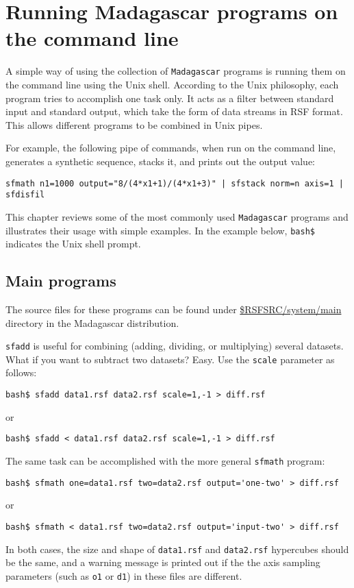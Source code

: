 \chapter{Running Madagascar programs on the command line}

A simple way of using the collection of \texttt{Madagascar} programs
is running them on the command line using the Unix shell. According to
the Unix philosophy, each program tries to accomplish one task
only. It acts as a filter between standard input and standard output,
which take the form of data streams in RSF format. This allows
different programs to be combined in Unix pipes.

For example, the following pipe of commands, when run on the command
line, generates a synthetic sequence, stacks it, and prints out the output value:
\begin{verbatim}
sfmath n1=1000 output="8/(4*x1+1)/(4*x1+3)" | sfstack norm=n axis=1 | sfdisfil
\end{verbatim}

This chapter reviews some of the most commonly used
\texttt{Madagascar} programs and illustrates their usage with simple
examples. In the example below, \verb+bash$+ indicates the Unix shell prompt.

\section{Main programs}

The source files for these programs can be found under
\href{http://sourceforge.net/p/rsf/code/HEAD/tree/trunk/system/main/}{\$RSFSRC/system/main}
directory in the Madagascar distribution.

\noindent\doublebox{\parbox{\textwidth}{

}}

\texttt{sfadd} is useful for combining (adding, dividing, or
multiplying) several datasets. What if you want to subtract two
datasets? Easy. Use the \texttt{scale} parameter as follows:
\begin{verbatim}
bash$ sfadd data1.rsf data2.rsf scale=1,-1 > diff.rsf
\end{verbatim}
or
\begin{verbatim}
bash$ sfadd < data1.rsf data2.rsf scale=1,-1 > diff.rsf
\end{verbatim}
The same task can be accomplished with the more general \texttt{sfmath} program:
\begin{verbatim}
bash$ sfmath one=data1.rsf two=data2.rsf output='one-two' > diff.rsf
\end{verbatim}
or
\begin{verbatim}
bash$ sfmath < data1.rsf two=data2.rsf output='input-two' > diff.rsf
\end{verbatim}
In both cases, the size and shape of \texttt{data1.rsf} and
\texttt{data2.rsf} hypercubes should be the same, and a warning
message is printed out if the the axis sampling parameters (such as
\texttt{o1} or \texttt{d1}) in these files are different.


